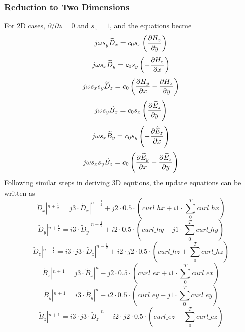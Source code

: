 \subsubsection{Reduction to Two Dimensions}
For 2D cases, $\partial / \partial z = 0$ and $s_z = 1$, and the equations becme
\begin{equation}
  j\omega s_y \widetilde{D}_x = c_0 s_x \left( \frac{\partial H_z}{\partial y}\right)
\end{equation}
\begin{equation}
  j\omega s_x \widetilde{D}_y = c_0 s_y \left(- \frac{\partial H_z}{\partial x}\right)
\end{equation}
\begin{equation}
  j\omega s_x s_y \widetilde{D}_z = c_0 \left( \frac{\partial H_y}{\partial x} - \frac{\partial H_x}{\partial y}\right)
\end{equation}
\begin{equation}
  j\omega s_y \widetilde{B}_x = c_0 s_x \left( \frac{\partial \widetilde{E}_z}{\partial y}\right)
\end{equation}
\begin{equation}
  j\omega s_x \widetilde{B}_y = c_0 s_y \left(- \frac{\partial \widetilde{E}_z}{\partial x}\right)
\end{equation}
\begin{equation}
  j\omega s_x s_y \widetilde{B}_z = c_0 \left( \frac{\partial \widetilde{E}_y}{\partial x} - \frac{\partial \widetilde{E}_x}{\partial y}\right)
\end{equation}
Following similar steps in deriving 3D equtions, the update equations can be written as
\begin{equation}
  \widetilde{D}_x|^{n+\frac{1}{2}} = j3 \cdot \widetilde{D}_x|^{n-\frac{1}{2}} + j2 \cdot 0.5 \cdot \left( curl\_hx + i1 \cdot \sum_0^T curl\_hx \right)
\end{equation}
\begin{equation}
  \widetilde{D}_y|^{n+\frac{1}{2}} = i3 \cdot \widetilde{D}_y|^{n-\frac{1}{2}} + i2 \cdot 0.5 \cdot \left( curl\_hy + j1 \cdot \sum_0^T curl\_hy \right)
\end{equation}
\begin{equation}
  \widetilde{D}_z|^{n+\frac{1}{2}} = i3 \cdot j3 \cdot \widetilde{D}_z|^{n-\frac{1}{2}} + i2 \cdot j2 \cdot 0.5 \cdot \left( curl\_hz + \sum_0^T curl\_hz \right)
\end{equation}
\begin{equation}
  \widetilde{B}_x|^{n+1} = j3 \cdot \widetilde{B}_x|^{n} - j2 \cdot 0.5 \cdot \left( curl\_ex + i1 \cdot \sum_0^T curl\_ex \right)
\end{equation}
\begin{equation}
  \widetilde{B}_y|^{n+1} = i3 \cdot \widetilde{B}_y|^{n} - i2 \cdot 0.5 \cdot \left( curl\_ey + j1 \cdot \sum_0^T curl\_ey \right)
\end{equation}
\begin{equation}
  \widetilde{B}_z|^{n+1} = i3 \cdot j3 \cdot \widetilde{B}_z|^{n} - i2 \cdot j2 \cdot 0.5 \cdot \left( curl\_ez + \sum_0^T curl\_ez \right)
\end{equation}




